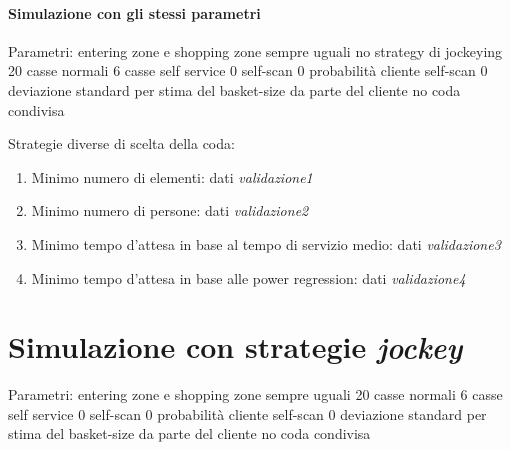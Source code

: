 \paragraph{Simulazione con gli stessi parametri}

Parametri:
entering zone e shopping zone sempre uguali
no strategy di jockeying
20 casse normali
6 casse self service
0 self-scan
0 probabilità cliente self-scan
0 deviazione standard per stima del basket-size da parte del cliente
no coda condivisa

Strategie diverse di scelta della coda:
\begin{enumerate}
	\item Minimo numero di elementi: dati \textit{validazione1}
	\item Minimo numero di persone: dati \textit{validazione2}
	\item Minimo tempo d'attesa in base al tempo di servizio medio: dati \textit{validazione3}
	\item Minimo tempo d'attesa in base alle power regression: dati \textit{validazione4} 
\end{enumerate}

\section{Simulazione con strategie \textit{jockey}}

Parametri:
entering zone e shopping zone sempre uguali
20 casse normali
6 casse self service
0 self-scan
0 probabilità cliente self-scan
0 deviazione standard per stima del basket-size da parte del cliente
no coda condivisa


